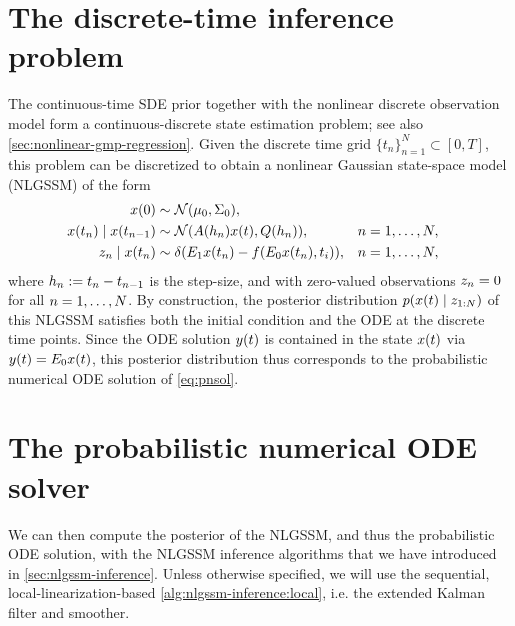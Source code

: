 \documentclass{mimosis}
\begin{document}
\section{The discrete-time inference problem}
\label{sec:org393ee11}
The continuous-time SDE prior together with the nonlinear discrete observation model form a continuous-discrete state estimation problem;
see also \cref{sec:nonlinear-gmp-regression}.
Given the discrete time grid
\(\{t_n\}_{n=1}^N \subset [0, T]\),
this problem can be discretized to obtain a nonlinear Gaussian state-space model (NLGSSM) of the form
\begin{subequations}
\label{eq:odefilter:nlgssm}
\begin{align}
\st(0) &\sim \N( \mu_0, \Sigma_0 ), \\
\st(t_\idxt) \mid \st(t_{\idxt-1}) &\sim \N( \transA(h_\idxt) \st(t), \transC(h_\idxt) ),
&&\idxt = 1, \dots, N, \\
\sobs_\idxt \mid \st(t_\idxt) &\sim \dirac(\proj{1} \st(t_\idxt) - \vf(\proj{0} \st(t_\idxt), t_i)),
&&\idxt = 1, \dots, N,
\end{align}
\end{subequations}
where \(h_n := t_n - t_{n-1}\) is the step-size, and
with zero-valued observations \(z_n = 0\) for all \(n = 1, \dots, N\).
By construction, the posterior distribution \(\p( \st(t) \mid \obs_{1:N} )\) of this NLGSSM satisfies both the initial condition and the ODE at the discrete time points.
Since the ODE solution \(y(t)\) is contained in the state \(x(t)\) via \(y(t) = E_{0} x(t)\), this posterior distribution thus corresponds to the probabilistic numerical ODE solution of \cref{eq:pnsol}.
\section{The probabilistic numerical ODE solver}
\label{sec:org545264b}
We can then compute the posterior of the NLGSSM, and thus the probabilistic ODE solution, with the NLGSSM inference algorithms that we have introduced in \cref{sec:nlgssm-inference}.
Unless otherwise specified, we will use the sequential, local-linearization-based
\cref{alg:nlgssm-inference:local},
i.e. the extended Kalman filter and smoother.
\end{document}
